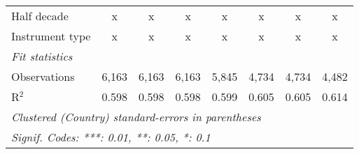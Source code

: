 \begin{tabular}{lccccccc}
   Half decade                                                                                        & x             & x            & x            & x       & x       & x       & x\\  
   Instrument type                                                                                    & x             & x            & x            & x       & x       & x       & x\\  
   \midrule \emph{Fit statistics}\\
   Observations                                                                                       & 6,163         & 6,163        & 6,163        & 5,845   & 4,734   & 4,734   & 4,482\\  
   R$^2$                                                                                              & 0.598         & 0.598        & 0.598        & 0.599   & 0.605   & 0.605   & 0.614\\  
   \midrule
   \multicolumn{8}{l}{\emph{Clustered (Country) standard-errors in parentheses}}\\
   \multicolumn{8}{l}{\emph{Signif. Codes: ***: 0.01, **: 0.05, *: 0.1}}\\
\end{tabular}
\par\endgroup


